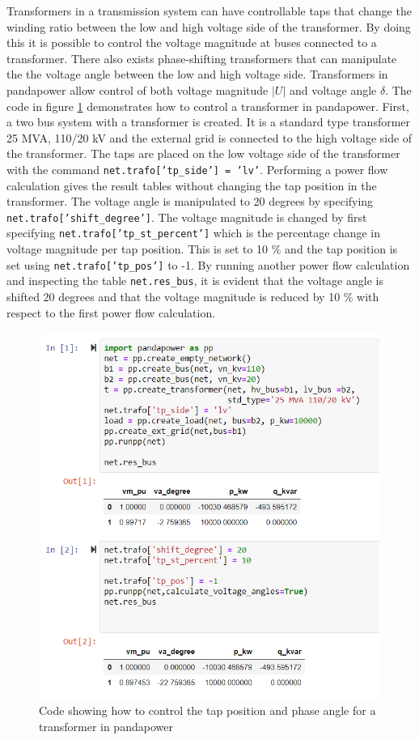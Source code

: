 \documentclass[class=book, crop=false, 11pt]{standalone}
\begin{document}
Transformers in a transmission system can have controllable taps that change the winding ratio between the low and high voltage side of the transformer. By doing this it is possible to control the voltage magnitude at buses connected to a transformer. There also exists phase-shifting transformers that can manipulate the the voltage angle between the low and high voltage side. Transformers in pandapower allow control of both voltage magnitude $|U|$ and voltage angle $\delta$. The code in figure \ref{fig:method:control_transformer} demonstrates how to control a transformer in pandapower. First, a two bus system with a transformer is created. It is a standard type transformer 25 MVA, 110/20 kV and the external grid is connected to the high voltage side of the transformer. The taps are placed on the low voltage side of the transformer with the command \texttt{net.trafo['tp\_side'] = 'lv'}. Performing a power flow calculation gives the result tables without changing the tap position in the transformer. The voltage angle is manipulated to 20 degrees by specifying \texttt{net.trafo['shift\_degree']}. The voltage magnitude is changed by first specifying \texttt{net.trafo['tp\_st\_percent']} which is the percentage change in voltage magnitude per tap position. This is set to 10 \% and the tap position is set using \texttt{net.trafo['tp\_pos']} to -1. By running another power flow calculation and inspecting the table \texttt{net.res\_bus}, it is evident that the voltage angle is shifted 20 degrees and that the voltage magnitude is reduced by 10 \% with respect to the first power flow calculation. 


\begin{figure}[H]
    \center
    \includegraphics[height=12cm, width=12cm]{figures/control_transformer.PNG}
    \caption[size = 9]{Code showing how to control the tap position and phase angle for a transformer in pandapower}
    \label{fig:method:control_transformer}
\end{figure}
\end{document}
